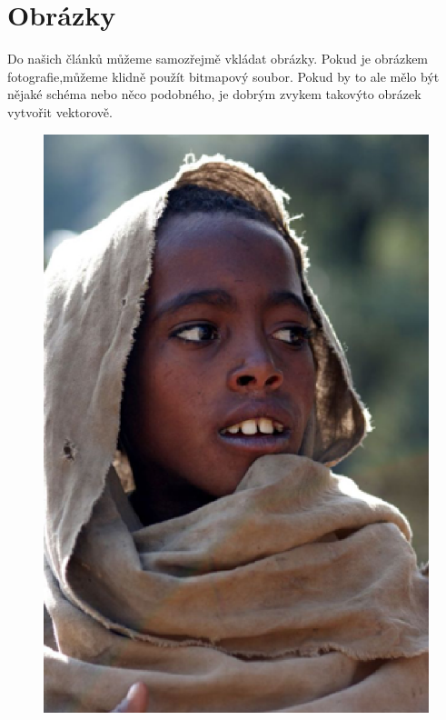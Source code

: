 \documentclass[a4paper, 11pt, hidelinks]{article}
\begin{document}
\section{Obrázky}
Do našich článků můžeme samozřejmě vkládat obrázky. Pokud je obrázkem fotografie,můžeme klidně použít bitmapový soubor. Pokud by to ale mělo být nějaké schéma nebo něco podobného, je dobrým zvykem takovýto obrázek vytvořit vektorově.
\begin{figure}[h]
\centering
\scalebox{0.425}
{
\includegraphics{etiopan.eps}
}
\end{figure}
\end{document}
